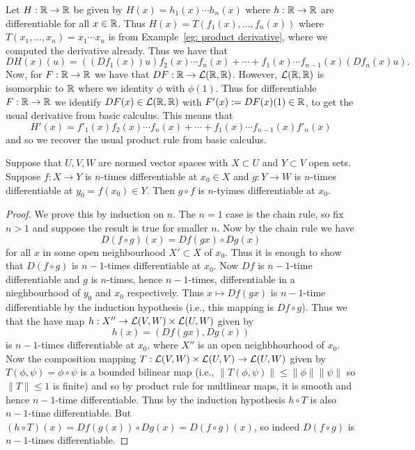 \documentclass[twoside, a4paper, 10pt]{amsart}
\begin{document}
\begin{eg} Let $H:\mathbb{R} \to \mathbb{R}$ be given by $H(x) = h_1(x) \cdots h_n(x)$ where $h:\mathbb{R} \to \mathbb{R}$ are differentiable for all $x \in \mathbb{R}$. Thus $H(x) = T(f_1(x), \ldots, f_n(x))$ where $T(x_1, \ldots, x_n) = x_1 \cdots x_n$ is from Example~\ref{eg: product derivative}, where we computed the derivative already. Thus we have that $$DH(x)(u) = ((Df_1(x))u)f_2(x) \cdots f_n(x) + \cdots + f_1(x) \cdots f_{n-1}(x) (Df_n(x) u).$$ Now, for $F: \mathbb{R} \to \mathbb{R}$ we have that $DF:\mathbb{R} \to \mathcal{L}(\mathbb{R}, \mathbb{R})$. However,  $\mathcal{L}(\mathbb{R}, \mathbb{R})$ is isomorphic to $\mathbb{R}$ where we identity $\phi$ with $\phi(1)$. Thus for differentiable $F:\mathbb{R} \to \mathbb{R}$ we identify $DF(x) \in \mathcal{L}(\mathbb{R}, \mathbb{R})$ with $F'(x) := DF(x)(1) \in \mathbb{R}$, to get the usual derivative from basic calculus. This means that 
$$H'(x) = f'_1(x)f_2(x) \cdots f_n(x) + \cdots + f_1(x) \cdots f_{n-1}(x) f'_n(x)$$
and so we recover the usual product rule from basic calculus.
\end{eg}

\begin{prop}\label{prop: composition differentiable}  Suppose that $U,V,W$ are normed vector spaces with $X \subset U$ and $Y \subset V$ open sets. Suppose $f:X \to Y$ is $n$-times differentiable at $x_0 \in X$ and $g:Y \to W$ is $n$-times differentiable at $y_0 = f(x_0) \in Y$. Then $g \circ f$ is $n$-tyimes differentiable at $x_0$.

\end{prop}

\begin{proof} We prove this by induction on $n$. The $n=1$ case is the chain rule, so fix $n>1$ and suppose the result is true for smaller $n$. Now by the chain rule we have $$D(f \circ g)(x) = Df(gx) \circ Dg(x)$$ for all $x$ in some open neighbourhood $X' \subset X$ of $x_0$. Thus it is enough to show that $D(f \circ g)$ is $n-1$-times differentiable at $x_0$. Now $Df$ is $n-1$-time differentiable and $g$ is $n$-times, hence $n-1$-times, differentiable in a nieghbourhood of $y_0$ and $x_0$ respectively. Thus $x \mapsto Df(gx)$ is $n-1$-time differentiable by the induction hypothesis (i.e., this mapping is $Df \circ g$). Thus we that the have map $h:X'' \to \mathcal{L}(V,W) \times \mathcal{L}(U,W)$ given by $$h(x) = (Df(gx), Dg(x))$$ is $n-1$-times differentiable at $x_0$, where $X''$ is an open neighbhourhood of $x_0$. Now the composition mapping $T:\mathcal{L}(V,W) \times \mathcal{L}(U,V) \to \mathcal{L}(U,W)$ given by $T(\phi, \psi) = \phi \circ \psi$ is a bounded bilinear map (i.e., $\|T(\phi, \psi) \| \leq \|\phi\| \|\psi\|$ so $\|T\| \leq 1$ is finite) and so by product rule for multlinear maps, it is smooth and hence $n-1$-time differentiable. Thus by the induction hypothesis $h \circ T$ is also $n-1$-time differentiable. But $(h \circ T)(x) = Df(g(x)) \circ Dg(x) = D(f \circ g)(x)$, so indeed $D(f \circ g)$ is $n-1$-times differentiable. \end{proof}
\end{document}

